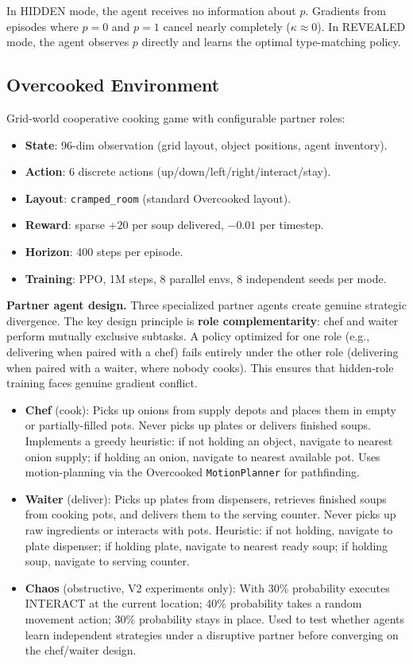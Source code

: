 \documentclass[letterpaper]{article}
\begin{document}
In HIDDEN mode, the agent receives no information about $p$.
Gradients from episodes where $p=0$ and $p=1$ cancel nearly completely ($\kappa \approx 0$).
In REVEALED mode, the agent observes $p$ directly and learns the optimal
type-matching policy.

\subsection{Overcooked Environment}

Grid-world cooperative cooking game with configurable partner roles:

\begin{itemize}
\item \textbf{State}: 96-dim observation (grid layout, object positions, agent inventory).
\item \textbf{Action}: 6 discrete actions (up/down/left/right/interact/stay).
\item \textbf{Layout}: \texttt{cramped\_room} (standard Overcooked layout).
\item \textbf{Reward}: sparse $+20$ per soup delivered, $-0.01$ per timestep.
\item \textbf{Horizon}: 400 steps per episode.
\item \textbf{Training}: PPO, 1M steps, 8 parallel envs, 8 independent seeds per mode.
\end{itemize}

\medskip
\noindent\textbf{Partner agent design.}
Three specialized partner agents create genuine strategic divergence.
The key design principle is \textbf{role complementarity}: chef and waiter perform mutually exclusive subtasks. A policy optimized for one role (e.g., delivering when paired with a chef) fails entirely under the other role (delivering when paired with a waiter, where nobody cooks). This ensures that hidden-role training faces genuine gradient conflict.

\begin{itemize}
\item \textbf{Chef} (cook): Picks up onions from supply depots and places them in empty or partially-filled pots. Never picks up plates or delivers finished soups. Implements a greedy heuristic: if not holding an object, navigate to nearest onion supply; if holding an onion, navigate to nearest available pot. Uses motion-planning via the Overcooked \texttt{MotionPlanner} for pathfinding.
\item \textbf{Waiter} (deliver): Picks up plates from dispensers, retrieves finished soups from cooking pots, and delivers them to the serving counter. Never picks up raw ingredients or interacts with pots. Heuristic: if not holding, navigate to plate dispenser; if holding plate, navigate to nearest ready soup; if holding soup, navigate to serving counter.
\item \textbf{Chaos} (obstructive, V2 experiments only): With 30\% probability executes INTERACT at the current location; 40\% probability takes a random movement action; 30\% probability stays in place. Used to test whether agents learn independent strategies under a disruptive partner before converging on the chef/waiter design.
\end{itemize}
\end{document}
